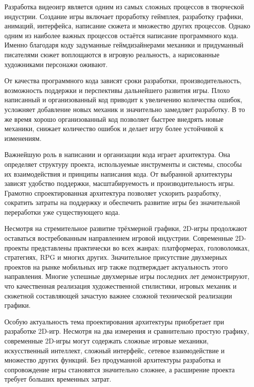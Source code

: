 \documentclass[a4paper,12pt]{report}
\begin{document}
\titlePage

\clearpage
\tableofcontents

\acronymsChapter

\introChapter

Разработка видеоигр является одним из самых сложных процессов в творческой индустрии. Создание игры включает проработку геймплея, разработку графики, анимаций, интерфейса, написание сюжета и множество других процессов. Однако одним из наиболее важных процессов остаётся написание программного кода. Именно благодаря коду задуманные геймдизайнерами механики и придуманный писателями сюжет воплощаются в игровую реальность, а нарисованные художниками персонажи оживают.

От качества программного кода зависят сроки разработки, производительность, возможность поддержки и перспективы дальнейшего развития игры. Плохо написанный и организованный код приводит к увеличению количества ошибок, усложняет добавление новых механик и значительно замедляет разработку. В то же время хорошо организованный код позволяет быстрее внедрять новые механики, снижает количество ошибок и делает игру более устойчивой к изменениям.

Важнейшую роль в написании и организации кода играет архитектура. Она определяет структуру проекта, используемые инструменты и системы, способы их взаимодействия и принципы написания кода. От выбранной архитектуры зависят удобство поддержки, масштабируемость и производительность игры. Грамотно спроектированная архитектура позволяет ускорить разработку, сократить затраты на поддержку и обеспечить развитие игры без значительной переработки уже существующего кода.

Несмотря на стремительное развитие трёхмерной графики, 2D-игры продолжают оставаться востребованным направлением игровой индустрии. Современные 2D-проекты представлены практически во всех жанрах: платформерах, головоломках, стратегиях, \acrshort{RPG} и многих других. Значительное присутствие двухмерных проектов на рынке мобильных игр также подтверждает актуальность этого направления. Многие успешные двухмерные игры последних лет демонстрируют, что качественная реализация художественной стилистики, игровых механик и сюжетной составляющей зачастую важнее сложной технической реализации графики.

Особую актуальность тема проектирования архитектуры приобретает при разработке 2D-игр. Несмотря на два измерения и сравнительно простую графику, современные 2D-игры могут содержать сложные игровые механики, искусственный интеллект, сложный интерфейс, сетевое взаимодействие и множество других функций. Без продуманной архитектуры разработка и сопровождение игры становятся значительно сложнее, а расширение проекта требует больших временных затрат.
\end{document}

